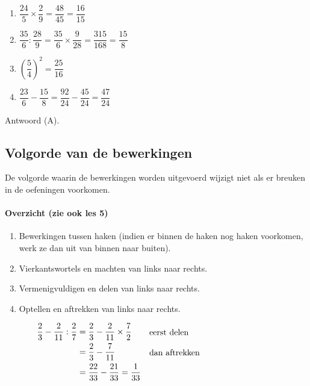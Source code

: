 \documentclass{bis}
\begin{document}
\begin{solution}
  \begin{enumerate}
    \item $\dfrac{24}{5}\times\dfrac{2}{9}=\dfrac{48}{45}=\dfrac{16}{15}$
    \item $\dfrac{35}{6}:\dfrac{28}{9}=\dfrac{35}{6}\times\dfrac{9}{28}=\dfrac{315}{168}=\dfrac{15}{8}$
    \item $\left(\dfrac{5}{4}\right)^2=\dfrac{25}{16}$
    \item $\dfrac{23}{6}-\dfrac{15}{8}=\dfrac{92}{24}-\dfrac{45}{24}=\dfrac{47}{24}$
  \end{enumerate}
Antwoord (A).
\end{solution}

\subsection{Volgorde van de bewerkingen}

De volgorde waarin de bewerkingen worden uitgevoerd wijzigt niet als er breuken in de oefeningen voorkomen.

\paragraph*{Overzicht (zie ook les 5)}
\begin{enumerate}[label=\arabic*.]
  \item Bewerkingen tussen haken (indien er binnen de haken nog haken voorkomen, werk ze dan uit van binnen naar buiten).
  \item Vierkantswortels en machten van links naar rechts.
  \item Vermenigvuldigen en delen van links naar rechts.
  \item Optellen en aftrekken van links naar rechts.
\end{enumerate}

\begin{voorbeeld}
\begin{align*}
  \dfrac{2}{3}-\dfrac{2}{11}:\dfrac{2}{7} &= \dfrac{2}{3}-\dfrac{2}{11}\times\dfrac{7}{2} & \parbox{15em}{eerst delen}\\
                                          &= \dfrac{2}{3}-\dfrac{7}{11} & \parbox{15em}{dan aftrekken}\\
                                          &= \dfrac{22}{33}-\dfrac{21}{33}=\dfrac{1}{33}
\end{align*}
\end{voorbeeld}
\end{document}
